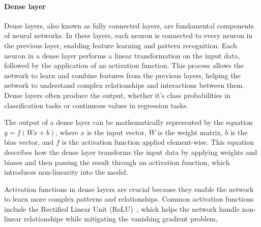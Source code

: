 \paragraph{Dense layer}
Dense layers, also known as fully connected layers, are fundamental components of neural networks. In these layers, each neuron is connected to every neuron in the previous layer, enabling feature learning and pattern recognition. Each neuron in a dense layer performs a linear transformation on the input data, followed by the application of an activation function. This process allows the network to learn and combine features from the previous layers, helping the network to understand complex relationships and interactions between them. Dense layers often produce the output, whether it’s class probabilities in classification tasks or continuous values in regression tasks.

The output of a dense layer can be mathematically represented by the equation $y=f(Wx+b)$, where $x$ is the input vector, $W$ is the weight matrix, $b$ is the bias vector, and $f$ is the activation function applied element-wise. This equation describes how the dense layer transforms the input data by applying weights and biases and then passing the result through an activation function, which introduces non-linearity into the model.

Activation functions in dense layers are crucial because they enable the network to learn more complex patterns and relationships. Common activation functions include the Rectified Linear Unit (ReLU)~\cite{relu}, which helps the network handle non-linear relationships while mitigating the vanishing gradient problem,


